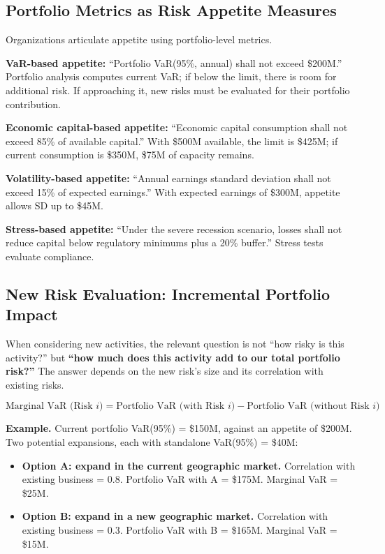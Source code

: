 \documentclass[11pt,openany]{book}
\providecommand{\tightlist}{\setlength{\itemsep}{0pt}\setlength{\parskip}{0pt}}
\begin{document}
\subsection{Portfolio Metrics as Risk Appetite Measures}
\label{subsec:portfolio-appetite-metrics}

Organizations articulate appetite using portfolio-level metrics.

\textbf{VaR-based appetite:} ``Portfolio VaR(95\%, annual) shall not exceed
\$200M.'' Portfolio analysis computes current VaR; if below the limit, there
is room for additional risk. If approaching it, new risks must be evaluated
for their portfolio contribution.

\textbf{Economic capital-based appetite:} ``Economic capital consumption shall
not exceed 85\% of available capital.'' With \$500M available, the limit is
\$425M; if current consumption is \$350M, \$75M of capacity remains.

\textbf{Volatility-based appetite:} ``Annual earnings standard deviation shall
not exceed 15\% of expected earnings.'' With expected earnings of \$300M,
appetite allows SD up to \$45M.

\textbf{Stress-based appetite:} ``Under the severe recession scenario, losses
shall not reduce capital below regulatory minimums plus a 20\% buffer.''
Stress tests evaluate compliance.

\subsection{New Risk Evaluation: Incremental Portfolio Impact}
\label{subsec:marginal-var}

When considering new activities, the relevant question is not ``how risky is
this activity?'' but \textbf{``how much does this activity add to our total
portfolio risk?''} The answer depends on the new risk's size and its
correlation with existing risks.

\[
\text{Marginal VaR (Risk } i\text{)}
  = \text{Portfolio VaR (with Risk } i\text{)}
  - \text{Portfolio VaR (without Risk } i\text{)}
\]

\textbf{Example.} Current portfolio VaR(95\%) = \$150M, against an appetite of
\$200M. Two potential expansions, each with standalone VaR(95\%) = \$40M:

\begin{itemize}\tightlist
  \item \textbf{Option A: expand in the current geographic market.}
        Correlation with existing business = 0.8. Portfolio VaR with A =
        \$175M. Marginal VaR = \$25M.
  \item \textbf{Option B: expand in a new geographic market.} Correlation with
        existing business = 0.3. Portfolio VaR with B = \$165M. Marginal VaR =
        \$15M.
\end{itemize}
\end{document}
